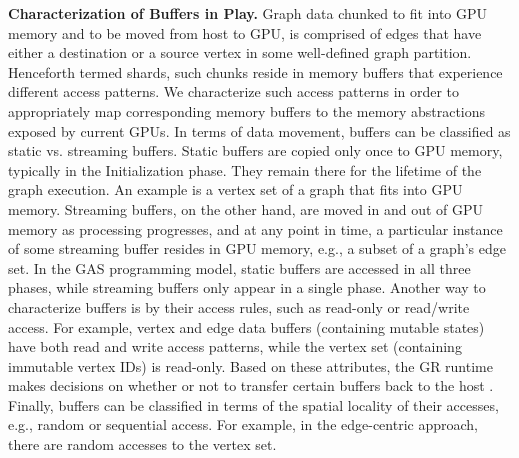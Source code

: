 \textbf{Characterization of Buffers in Play. }
Graph data chunked to fit into GPU memory and to be moved from host to GPU, is comprised of edges that have either a destination or a source vertex in some well-defined graph partition. Henceforth termed shards, such chunks reside in memory buffers that experience different access patterns. We characterize such access patterns in order to appropriately map corresponding memory buffers to the memory abstractions exposed by current GPUs. In terms of data movement, buffers can be classified as static vs. streaming buffers. Static buffers are copied only once to GPU memory, typically in the Initialization phase. They remain there for the lifetime of the graph execution. An example is a vertex set of a graph that fits into GPU memory. Streaming buffers, on the other hand, are moved in and out of GPU memory as processing progresses, and at any point in time, a particular instance of some streaming buffer resides in GPU memory, e.g., a subset of a graph’s edge set. In the GAS programming model, static buffers are accessed in all three phases, while streaming buffers only appear in a single phase. Another way to characterize buffers is by their access rules, such as read-only or read/write access. For example, vertex and edge data buffers (containing mutable states) have both read and write access patterns, while the vertex set (containing immutable vertex IDs) is read-only. Based on these attributes, the GR runtime makes decisions on whether or not to transfer certain buffers back to the host . Finally, buffers can be classified in terms of the spatial locality of their accesses, e.g., random or sequential access. For example, in the edge-centric approach, there are random accesses to the vertex set.
